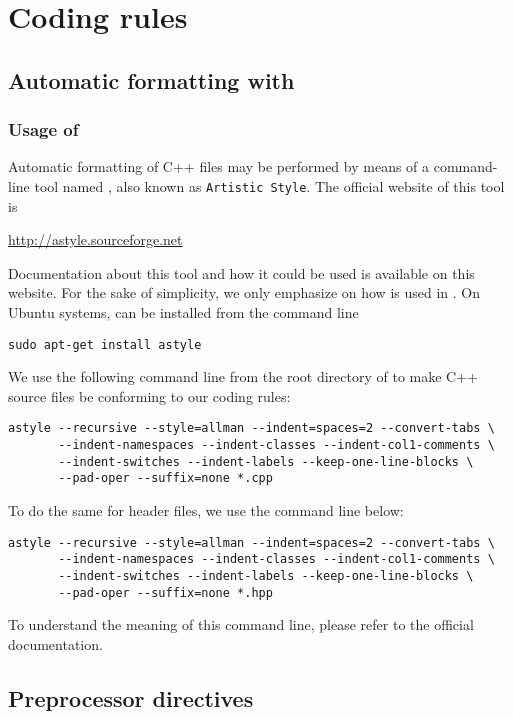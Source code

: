 


\chapter{Coding rules}


\section{Automatic formatting with \Astyle}

\subsection{Usage of \Astyle}

Automatic formatting of C++ files may be performed by means of a command-line tool named \Astyle, also known as \texttt{Artistic Style}. The official website of this tool is 
\begin{center}
\url{http://astyle.sourceforge.net}
\end{center}
Documentation about this tool and how it could be used is available on this website. For the sake of simplicity, we only emphasize on how \Astyle is used in \Simol. On Ubuntu systems, \Astyle can be installed from the command line
\begin{verbatim}
sudo apt-get install astyle
\end{verbatim}
We use the following command line from the root directory of \Simol to make C++ source files be conforming to our coding rules:
\begin{verbatim}
astyle --recursive --style=allman --indent=spaces=2 --convert-tabs \
       --indent-namespaces --indent-classes --indent-col1-comments \
       --indent-switches --indent-labels --keep-one-line-blocks \
       --pad-oper --suffix=none *.cpp
\end{verbatim}
To do the same for header files, we use the command line below:
\begin{verbatim}
astyle --recursive --style=allman --indent=spaces=2 --convert-tabs \
       --indent-namespaces --indent-classes --indent-col1-comments \
       --indent-switches --indent-labels --keep-one-line-blocks \
       --pad-oper --suffix=none *.hpp
\end{verbatim}
To understand the meaning of this command line, please refer to the official documentation.


\section{Preprocessor directives}


